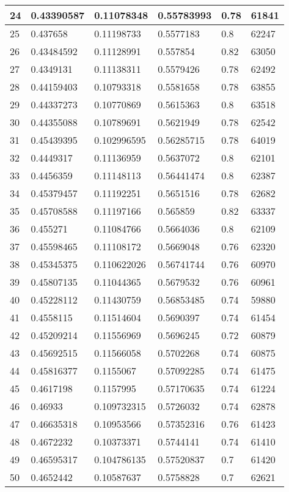 \begin{longtable}{|l|l|l|l|l|l|}
24 & 0.43390587 & 0.11078348 & 0.55783993 & 0.78 & 61841 \\ \hline 
25 & 0.437658 & 0.11198733 & 0.5577183 & 0.8 & 62247 \\ \hline 
26 & 0.43484592 & 0.11128991 & 0.557854 & 0.82 & 63050 \\ \hline 
27 & 0.4349131 & 0.11138311 & 0.5579426 & 0.78 & 62492 \\ \hline 
28 & 0.44159403 & 0.10793318 & 0.5581658 & 0.78 & 63855 \\ \hline 
29 & 0.44337273 & 0.10770869 & 0.5615363 & 0.8 & 63518 \\ \hline 
30 & 0.44355088 & 0.10789691 & 0.5621949 & 0.78 & 62542 \\ \hline 
31 & 0.45439395 & 0.102996595 & 0.56285715 & 0.78 & 64019 \\ \hline 
32 & 0.4449317 & 0.11136959 & 0.5637072 & 0.8 & 62101 \\ \hline 
33 & 0.4456359 & 0.11148113 & 0.56441474 & 0.8 & 62387 \\ \hline 
34 & 0.45379457 & 0.11192251 & 0.5651516 & 0.78 & 62682 \\ \hline 
35 & 0.45708588 & 0.11197166 & 0.565859 & 0.82 & 63337 \\ \hline 
36 & 0.455271 & 0.11084766 & 0.5664036 & 0.8 & 62109 \\ \hline 
37 & 0.45598465 & 0.11108172 & 0.5669048 & 0.76 & 62320 \\ \hline 
38 & 0.45345375 & 0.110622026 & 0.56741744 & 0.76 & 60970 \\ \hline 
39 & 0.45807135 & 0.11044365 & 0.5679532 & 0.76 & 60961 \\ \hline 
40 & 0.45228112 & 0.11430759 & 0.56853485 & 0.74 & 59880 \\ \hline 
41 & 0.4558115 & 0.11514604 & 0.5690397 & 0.74 & 61454 \\ \hline 
42 & 0.45209214 & 0.11556969 & 0.5696245 & 0.72 & 60879 \\ \hline 
43 & 0.45692515 & 0.11566058 & 0.5702268 & 0.74 & 60875 \\ \hline 
44 & 0.45816377 & 0.1155067 & 0.57092285 & 0.74 & 61475 \\ \hline 
45 & 0.4617198 & 0.1157995 & 0.57170635 & 0.74 & 61224 \\ \hline 
46 & 0.46933 & 0.109732315 & 0.5726032 & 0.74 & 62878 \\ \hline 
47 & 0.46635318 & 0.10953566 & 0.57352316 & 0.76 & 61423 \\ \hline 
48 & 0.4672232 & 0.10373371 & 0.5744141 & 0.74 & 61410 \\ \hline 
49 & 0.46595317 & 0.104786135 & 0.57520837 & 0.7 & 61420 \\ \hline 
50 & 0.4652442 & 0.10587637 & 0.5758828 & 0.7 & 62621 \\ \hline 
\end{longtable}